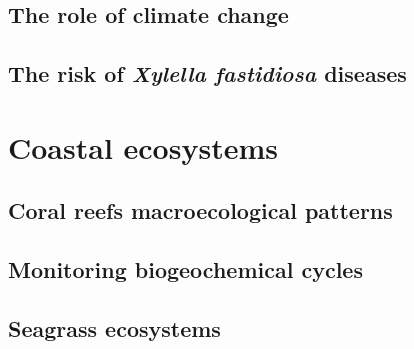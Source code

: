 

\subsection{\label{sec:The role of climate change} The role of climate change}




\subsection{\label{sec:The risk of Xylella fastidiosa diseases} The risk of
  \textit{Xylella fastidiosa} diseases}

\section{\label{sec:Data-driven modelling for coastal ecosystems} Coastal
  ecosystems}

\subsection{\label{sec:Coral reefs macroecological patterns} Coral reefs
  macroecological patterns}

\subsection{\label{sec:Monitoring biogeochemical cycles} Monitoring
  biogeochemical cycles}

\subsection{\label{sec:Seagrass ecosystems} Seagrass ecosystems}